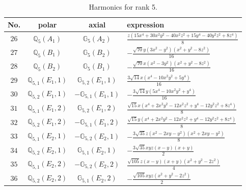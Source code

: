 \documentclass[fleqn,8pt,landscape]{jsarticle}
\begin{document}
\begin{table}[ht!]
\begin{center}
\caption{Harmonics for rank 5.}
\renewcommand{\arraystretch}{1.3}
\begin{tabular}{cccl} \hline \hline
No. & polar & axial & expression \\ \hline
$ 26 $ & $ \mathbb{Q}_{5}(A_{1}) $ & $ \mathbb{G}_{5}(A_{2}) $ & $ \frac{z \left(15 x^{4} + 30 x^{2} y^{2} - 40 x^{2} z^{2} + 15 y^{4} - 40 y^{2} z^{2} + 8 z^{4}\right)}{8} $ \\
$ 27 $ & $ \mathbb{Q}_{5}(B_{1}) $ & $ \mathbb{G}_{5}(B_{2}) $ & $ - \frac{\sqrt{70} y \left(3 x^{2} - y^{2}\right) \left(x^{2} + y^{2} - 8 z^{2}\right)}{16} $ \\
$ 28 $ & $ \mathbb{Q}_{5}(B_{2}) $ & $ \mathbb{G}_{5}(B_{1}) $ & $ - \frac{\sqrt{70} x \left(x^{2} - 3 y^{2}\right) \left(x^{2} + y^{2} - 8 z^{2}\right)}{16} $ \\
$ 29 $ & $ \mathbb{Q}_{5,1}(E_{1},1) $ & $ \mathbb{G}_{5,2}(E_{1},1) $ & $ \frac{3 \sqrt{14} x \left(x^{4} - 10 x^{2} y^{2} + 5 y^{4}\right)}{16} $ \\
$ 30 $ & $ \mathbb{Q}_{5,2}(E_{1},1) $ & $ -\mathbb{G}_{5,1}(E_{1},1) $ & $ - \frac{3 \sqrt{14} y \left(5 x^{4} - 10 x^{2} y^{2} + y^{4}\right)}{16} $ \\
$ 31 $ & $ \mathbb{Q}_{5,1}(E_{1},2) $ & $ \mathbb{G}_{5,2}(E_{1},2) $ & $ \frac{\sqrt{15} x \left(x^{4} + 2 x^{2} y^{2} - 12 x^{2} z^{2} + y^{4} - 12 y^{2} z^{2} + 8 z^{4}\right)}{8} $ \\
$ 32 $ & $ \mathbb{Q}_{5,2}(E_{1},2) $ & $ -\mathbb{G}_{5,1}(E_{1},2) $ & $ \frac{\sqrt{15} y \left(x^{4} + 2 x^{2} y^{2} - 12 x^{2} z^{2} + y^{4} - 12 y^{2} z^{2} + 8 z^{4}\right)}{8} $ \\
$ 33 $ & $ \mathbb{Q}_{5,1}(E_{2},1) $ & $ -\mathbb{G}_{5,2}(E_{2},1) $ & $ - \frac{3 \sqrt{35} z \left(x^{2} - 2 x y - y^{2}\right) \left(x^{2} + 2 x y - y^{2}\right)}{8} $ \\
$ 34 $ & $ \mathbb{Q}_{5,2}(E_{2},1) $ & $ \mathbb{G}_{5,1}(E_{2},1) $ & $ - \frac{3 \sqrt{35} x y z \left(x - y\right) \left(x + y\right)}{2} $ \\
$ 35 $ & $ \mathbb{Q}_{5,1}(E_{2},2) $ & $ -\mathbb{G}_{5,2}(E_{2},2) $ & $ \frac{\sqrt{105} z \left(x - y\right) \left(x + y\right) \left(x^{2} + y^{2} - 2 z^{2}\right)}{4} $ \\
$ 36 $ & $ \mathbb{Q}_{5,2}(E_{2},2) $ & $ \mathbb{G}_{5,1}(E_{2},2) $ & $ - \frac{\sqrt{105} x y z \left(x^{2} + y^{2} - 2 z^{2}\right)}{2} $ \\
 \hline \hline
\end{tabular}
\end{center}
\end{table}
\end{document}
